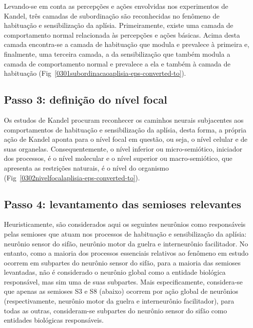 Levando-se em conta as percepções e ações envolvidas nos experimentos de Kandel, três camadas de subordinação são reconhecidas no fenômeno de habituação e sensibilização da aplísia. Primeiramente, existe uma camada de comportamento normal relacionada às percepções e ações básicas. Acima desta camada encontra-se a camada de habituação que modula e prevalece à primeira e, finalmente, uma terceira camada, a da sensibilização que também modula a camada de comportamento normal e prevalece a ela e também à camada de habituação (Fig~\ref{0301subordinacaoaplisia-eps-converted-to}).


\subsection{Passo 3: definição do nível focal}

Os estudos de Kandel procuram reconhecer os caminhos neurais subjacentes aos comportamentos de habituação e sensibilização da aplísia, desta forma, a própria ação de Kandel aponta para o nível focal em questão, ou seja, o nível celular e de suas organelas. Consequentemente, o nível inferior ou micro-semiótico, iniciador dos processos, é o nível molecular e o nível superior ou macro-semiótico, que apresenta as restrições naturais, é o nível do organismo~\cite{kandel06, kandel00} (Fig~\ref{0302nivelfocalaplisia-eps-converted-to}).


\subsection{Passo 4: levantamento das semioses relevantes}

Heuristicamente, são considerados aqui os seguintes neurônios como responsáveis pelas semioses que atuam nos processos de habituação e sensibilização da aplísia: neurônio sensor do sifão, neurônio motor da guelra e interneurônio facilitador. No entanto, como a maioria dos processos essenciais relativos ao fenômeno em estudo ocorrem em subpartes do neurônio sensor do sifão, para a maioria das semioses levantadas, não é considerado o neurônio global como a entidade biológica responsável, mas sim uma de suas subpartes. Mais especificamente, considera-se que apenas as semioses S3 e S8 (abaixo) ocorrem por ação global de neurônios (respectivamente, neurônio motor da guelra e interneurônio facilitador), para todas as outras, consideram-se subpartes do neurônio sensor do sifão como entidades biológicas responsáveis.

